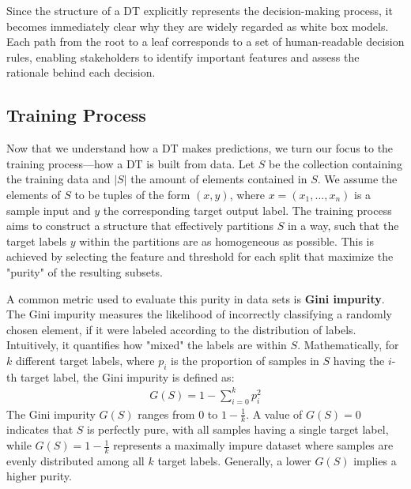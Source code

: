 
Since the structure of a DT explicitly represents the decision-making process,
it becomes immediately clear why they are widely regarded as white box models.
Each path from the root to a leaf corresponds to a set of human-readable decision rules,
enabling stakeholders to identify important features and assess the rationale behind each decision.

\subsection{Training Process}
\label{sec:dt_training}
Now that we understand how a DT makes predictions,
we turn our focus to the training process—how a DT is built from data.
Let $S$ be the collection containing the training data
and $|S|$ the amount of elements contained in $S$.
We assume the elements of $S$ to be tuples of the form $(x, y)$,
where $x = (x_1, ..., x_n)$ is a sample input and $y$ the corresponding target output label.
The training process aims to construct a structure that effectively partitions $S$ in a way,
such that the target labels $y$ within the partitions are as homogeneous as possible.
This is achieved by selecting the feature
and threshold for each split that maximize the "purity" of the resulting subsets.

A common metric used to evaluate this purity in data sets is \textbf{Gini impurity}.
The Gini impurity measures the likelihood of incorrectly classifying
a randomly chosen element, if it were labeled according to the distribution of labels.
Intuitively, it quantifies how "mixed" the labels are within $S$.
Mathematically, for $k$ different target labels,
where $p_i$ is the proportion of samples in $S$ having the $i$-th target label,
the Gini impurity is defined as:
\begin{align}
  G(S) = 1 - \sum_{i=0}^{k}p_i^2
\end{align}
The Gini impurity $G(S)$ ranges from $0$ to $1 - \frac{1}{k}$.
A value of $G(S) = 0$ indicates that $S$ is perfectly pure,
with all samples having a single target label,
while $G(S) = 1 - \frac{1}{k}$ represents a maximally impure dataset
where samples are evenly distributed among all $k$ target labels.
Generally, a lower $G(S)$ implies a higher purity.
\cite{gini}

